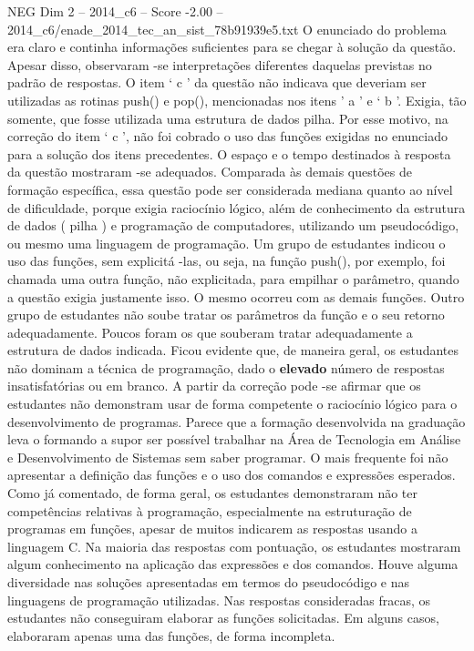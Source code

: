 \begin{textsample}{NEG Dim 2 – 2014\_c6 – Score -2.00 – 2014\_c6/enade\_2014\_tec\_an\_sist\_78b91939e5.txt}
O enunciado do problema era claro e continha informações suficientes para se chegar à solução da questão.
Apesar disso, observaram -se interpretações diferentes daquelas previstas no padrão de respostas.
O item ‘ c ’ da questão não indicava que deveriam ser utilizadas as rotinas push() e pop(), mencionadas nos itens ’ a ’ e ‘ b ’.
Exigia, tão somente, que fosse utilizada uma estrutura de dados pilha.
Por esse motivo, na correção do item ‘ c ’, não foi cobrado o uso das funções exigidas no enunciado para a solução dos itens precedentes.
O espaço e o tempo destinados à resposta da questão mostraram -se adequados.
Comparada às demais questões de formação específica, essa questão pode ser considerada mediana quanto ao nível de dificuldade, porque exigia raciocínio lógico, além de conhecimento da estrutura de dados ( pilha ) e programação de computadores, utilizando um pseudocódigo, ou mesmo uma linguagem de programação.
Um grupo de estudantes indicou o uso das funções, sem explicitá -las, ou seja, na função push(), por exemplo, foi chamada uma outra função, não explicitada, para empilhar o parâmetro, quando a questão exigia justamente isso.
O mesmo ocorreu com as demais funções.
Outro grupo de estudantes não soube tratar os parâmetros da função e o seu retorno adequadamente.
Poucos foram os que souberam tratar adequadamente a estrutura de dados indicada.
Ficou evidente que, de maneira geral, os estudantes não dominam a técnica de programação, dado o \textbf{elevado} número de respostas insatisfatórias ou em branco.
A partir da correção pode -se afirmar que os estudantes não demonstram usar de forma competente o raciocínio lógico para o desenvolvimento de programas.
Parece que a formação desenvolvida na graduação leva o formando a supor ser possível trabalhar na Área de Tecnologia em Análise e Desenvolvimento de Sistemas sem saber programar.
O mais frequente foi não apresentar a definição das funções e o uso dos comandos e expressões esperados.
Como já comentado, de forma geral, os estudantes demonstraram não ter competências relativas à programação, especialmente na estruturação de programas em funções, apesar de muitos indicarem as respostas usando a linguagem C.
Na maioria das respostas com pontuação, os estudantes mostraram algum conhecimento na aplicação das expressões e dos comandos.
Houve alguma diversidade nas soluções apresentadas em termos do pseudocódigo e nas linguagens de programação utilizadas.
Nas respostas consideradas fracas, os estudantes não conseguiram elaborar as funções solicitadas.
Em alguns casos, elaboraram apenas uma das funções, de forma incompleta.

\end{textsample}
